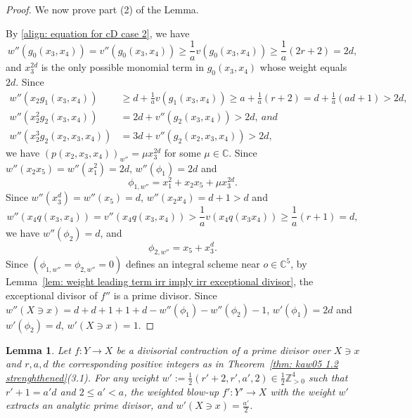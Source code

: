 \documentclass[11pt]{amsart}
\numberwithin{equation}{section}
\newcommand{\Cc}{\mathbb{C}}
\newtheorem{lem}[thm]{Lemma}
\theoremstyle{definition}
\theoremstyle{definition}
\begin{document}
\begin{proof}
\medskip

We now prove part (2) of the Lemma. 

By \eqref{align: equation for cD case 2}, we have $$w''(g_0(x_3,x_4))=v''(g_0(x_3,x_4))\geq \frac{1}{a}v(g_0(x_3,x_4))\geq \frac{1}{a}(2r+2)=2d,$$ and $x_3^{2d}$ is the only possible monomial term in $g_0(x_3,x_4)$ whose weight equals $2d$. Since
\begin{align*}
    w''(x_2g_1(x_3,x_4))&\geq d+\frac{1}{a}v(g_1(x_3,x_4))\geq a+\frac{1}{a}(r+2)=d+\frac{1}{a}(ad+1)>2d,\\
    w''(x_2^2g_2(x_3,x_4))&=2d+v''(g_2(x_3,x_4))>2d,\ and\\
    w''(x_2^3g_2(x_2,x_3,x_4))&=3d+v''(g_2(x_2,x_3,x_4))>2d,
\end{align*}
we have $(p(x_2,x_3,x_4))_{w''}=\mu x_3^{2d}$ for some $\mu\in \Cc$. Since $w''(x_2x_5)=w''(x_1^2)=2d$, $w''(\phi_1)=2d$ and $$\phi_{1,w''}=x_1^2+x_2x_5+\mu x_3^{2d}.$$ Since $w''(x_3^d)=w''(x_5)=d$, $w''(x_2x_4)=d+1>d$ and $$w''(x_4q(x_3,x_4))=v''(x_4q(x_3,x_4))>\frac{1}{a}v(x_4q(x_3x_4))\geq \frac{1}{a}(r+1)=d,$$ we have $w''(\phi_2)=d$, and $$\phi_{2,w''}=x_5+x_3^d.$$ Since $(\phi_{1,w''}=\phi_{2,w''}=0)$ defines an integral scheme near $o\in \Cc^5$, by Lemma~\ref{lem: weight leading term irr imply irr exceptional divisor}, the exceptional divisor of $f''$ is a prime divisor. Since $w''(X\ni x)=d+d+1+1+d-w''(\phi_1)-w''(\phi_2)-1$, $w'(\phi_1)=2d$ and $w'(\phi_2)=d$, $w'(X\ni x)=1$.
\end{proof}

\begin{lem}\label{lem: cD/2 irreducible case 1}
Let $f: Y\to X$ be a divisorial contraction of a prime divisor over $X\ni x$ and $r,a,d$ the corresponding positive integers as in Theorem~\ref{thm: kaw05 1.2 strenghthened}(3.1). For any weight $w':=\frac{1}{2}(r'+2,r',a',2)\in\frac{1}{2}\mathbb Z_{>0}^4$ such that $r'+1=a'd$ and $2\leq a'<a$, the weighted blow-up $f':Y'\to X$ with the weight $w'$ extracts an analytic prime divisor, and $w'(X\ni x)=\frac{a'}{2}$. 
\end{lem}
\end{document}
